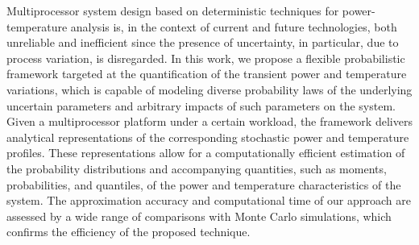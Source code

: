 Multiprocessor system design based on deterministic techniques for power-temperature analysis is, in the context of current and future technologies, both unreliable and inefficient since the presence of uncertainty, in particular, due to process variation, is disregarded.
In this work, we propose a flexible probabilistic framework targeted at the quantification of the transient power and temperature variations, which is capable of modeling diverse probability laws of the underlying uncertain parameters and arbitrary impacts of such parameters on the system.
Given a multiprocessor platform under a certain workload, the framework delivers analytical representations of the corresponding stochastic power and temperature profiles.
These representations allow for a computationally efficient estimation of the probability distributions and accompanying quantities, such as moments, probabilities, and quantiles, of the power and temperature characteristics of the system.
The approximation accuracy and computational time of our approach are assessed by a wide range of comparisons with Monte Carlo simulations, which confirms the efficiency of the proposed technique.
